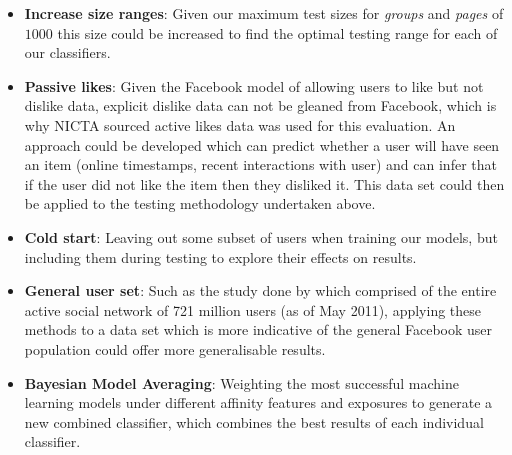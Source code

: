 \begin{itemize}
\item \textbf{Increase size ranges}: Given our maximum test sizes for \emph{groups} and \emph{pages} of $1000$ this size could be 
increased to find the optimal testing range for each of our classifiers.
\item \textbf{Passive likes}: Given the Facebook model of allowing users to like but not dislike data, explicit dislike data can not be 
gleaned from Facebook, which is why NICTA sourced active likes data was used for this evaluation. An approach could be developed 
which can predict whether a user will have seen an item (online timestamps, recent interactions with user) and can infer that if the 
user did not like the item then they disliked it. This data set could then be applied to the testing methodology undertaken above.
\item \textbf{Cold start}: Leaving out some subset of users when training our models, but including them during testing to explore their 
effects on results.
\item \textbf{General user set}: Such as the study done by \cite{jugand} which comprised of the entire active social network of 721 million users 
(as of May 2011), applying these methods to a data set which is more indicative of the general Facebook user population could offer more 
generalisable results.
\item \textbf{Bayesian Model Averaging}: Weighting the most successful machine learning models under different affinity features and 
exposures to generate a new combined classifier, which combines the best results of each individual classifier.
\end{itemize}

